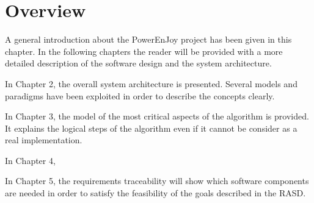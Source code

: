 \section{Overview}

A general introduction about the PowerEnJoy project has been given in this chapter. In the following chapters the reader will be provided with a more detailed description of the software design and the system architecture.

In Chapter 2, the overall system architecture is presented. Several models and paradigms have been exploited in order to describe the concepts clearly.

In Chapter 3, the model of the most critical aspects of the algorithm is provided. It explains the logical steps of the algorithm even if it cannot be consider as a real implementation.

In Chapter 4, 

In Chapter 5, the requirements traceability will show which software components are needed in order to satisfy the feasibility of the goals described in the RASD.
